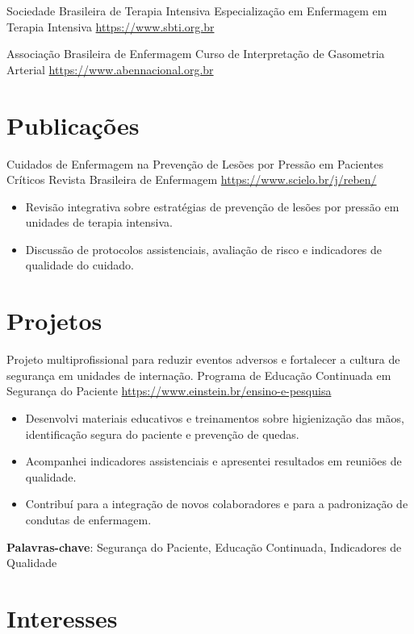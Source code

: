 \documentclass[a4paper, serif, 10pt]{moderncv}
\begin{document}
        {Sociedade Brasileira de Terapia Intensiva}
        {Especialização em Enfermagem em Terapia Intensiva}
        {\url{https://www.sbti.org.br}}
        {}
        {}

        {Associação Brasileira de Enfermagem}
        {Curso de Interpretação de Gasometria Arterial}
        {\url{https://www.abennacional.org.br}}
        {}
        {}
\section{Publicações}

        {Cuidados de Enfermagem na Prevenção de Lesões por Pressão em Pacientes Críticos}
        {Revista Brasileira de Enfermagem}
        {\url{https://www.scielo.br/j/reben/}}
        {}
        {\begin{itemize}
\item Revisão integrativa sobre estratégias de prevenção de lesões por pressão em unidades de terapia intensiva.
\item Discussão de protocolos assistenciais, avaliação de risco e indicadores de qualidade do cuidado.
\end{itemize}}
\section{Projetos}

        {Projeto multiprofissional para reduzir eventos adversos e fortalecer a cultura de segurança em unidades de internação.}
        {Programa de Educação Continuada em Segurança do Paciente}
        {\url{https://www.einstein.br/ensino-e-pesquisa}}
        {}
        {\begin{itemize}
\item Desenvolvi materiais educativos e treinamentos sobre higienização das mãos, identificação segura do paciente e prevenção de quedas.
\item Acompanhei indicadores assistenciais e apresentei resultados em reuniões de qualidade.
\item Contribuí para a integração de novos colaboradores e para a padronização de condutas de enfermagem.
\end{itemize}
\textbf{Palavras-chave}: Segurança do Paciente, Educação Continuada, Indicadores de Qualidade}
\section{Interesses}
\end{document}
